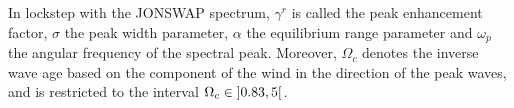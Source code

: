 In lockstep with the JONSWAP spectrum, 
$\gamma^r$ is called the peak enhancement factor, $\sigma$ the peak width 
parameter, $\alpha$ the equilibrium range parameter and $\omega_p$ the angular 
frequency of the spectral peak. Moreover, $\Omega_c$ denotes the inverse 
wave age based on the component of the wind in the direction of the peak waves,
and is restricted to the interval $\Omega_c \in \interval[open left, open 
right]{0.83}{5}$.
%
\begin{figure}[p]
 \centering
 \hfill
\end{figure}
